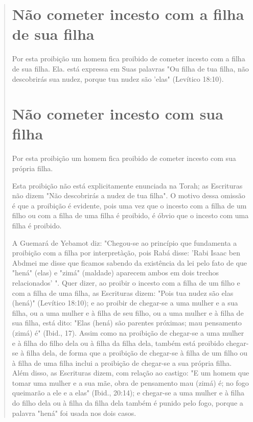 \begin{quote}
\section{Não cometer incesto com a filha de sua filha}

Por esta proibição um homem fica proibido de cometer incesto com a filha
de sua filha. Ela. está expressa em Suas palavras "Ou filha de tua
filha, não descobrirás sua nudez, porque tua nudez são 'elas" (Levítico
18:10).

\section{Não cometer incesto com sua filha}

Por esta proibição um homem fica proibido de cometer incesto com sua
própria filha.

Esta proibição não está explicitamente enunciada na Torah; as
Escri­turas não dizem "Não descobrirás a nudez de tua filha". O motivo
dessa omis­são é que a proibição é evidente, pois uma vez que o incesto
com a filha de um filho ou com a filha de uma filha é proibido, é óbvio
que o incesto com uma filha é proibido.

A Guemará de Yebamot diz: "Chegou-se ao princípio que fundamenta a
proibição com a filha por interpretàção, pois Rabá disse: 'Rabi Isaac
ben Abd­mei me disse que ficamos sabendo da existência da lei pelo fato
de que "hená" (elas) e "zimá" (maldade) aparecem ambos em dois trechos
relacionados' ". Quer dizer, ao proibir o incesto com a filha de um
filho e com a filha de uma filha, as Escrituras dizem: "Pois tua nudez
são elas (hená)" (Levítico 18:10); e ao proi­bir de chegar-se a uma
mulher e a sua filha, ou a uma mulher e à filha de seu filho, ou a uma
mulher e à filha de sua filha, está dito: "Elas (hená) são parentes
próximas; mau pensamento (zimá) é" (Ibid., 17). Assim como na proibição
de chegar-se a uma mulher e à filha do filho dela ou à filha da filha
dela, também está proibido chegar-se à filha dela, de forma que a
proibição de chegar-se à filha de um filho ou à filha de uma filha
inclui a proibição de chegar-se a sua própria filha. Além disso, as
Escrituras dizem, com relação ao castigo: "E um homem que tomar uma
mulher e a sua mãe, obra de pensamento mau (zimá) é; no fogo queimarão a
ele e a elas" (Ibid., 20:14); e chegar-se a uma mulher e à filha do
filho dela ou à filha da filha dela também é punido pelo fogo, por­que a
palavra "hená" foi usada nos dois casos.


\end{quote}
